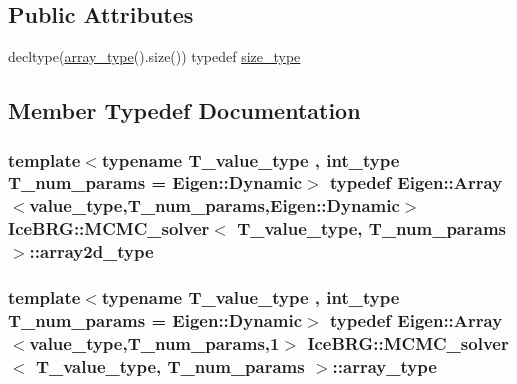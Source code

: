 \subsection*{Public Attributes}
\begin{DoxyCompactItemize}
\item 
decltype(\hyperlink{classIceBRG_1_1MCMC__solver_ad97acf248381de04fa6fc4bdcd3f9a63}{array\+\_\+type}().size()) typedef \hyperlink{classIceBRG_1_1MCMC__solver_ae03c5e41621464a1bfcc7aac7cace475}{size\+\_\+type}
\end{DoxyCompactItemize}


\subsection{Member Typedef Documentation}
\hypertarget{classIceBRG_1_1MCMC__solver_a078c222e71acc977dd50aa67f50a9983}{}
\subsubsection[{array2d\+\_\+type}]{\setlength{\rightskip}{0pt plus 5cm}template$<$typename T\+\_\+value\+\_\+type , int\+\_\+type T\+\_\+num\+\_\+params = Eigen\+::\+Dynamic$>$ typedef Eigen\+::\+Array$<${\bf value\+\_\+type},T\+\_\+num\+\_\+params,Eigen\+::\+Dynamic$>$ {\bf Ice\+B\+R\+G\+::\+M\+C\+M\+C\+\_\+solver}$<$ T\+\_\+value\+\_\+type, T\+\_\+num\+\_\+params $>$\+::{\bf array2d\+\_\+type}}\label{classIceBRG_1_1MCMC__solver_a078c222e71acc977dd50aa67f50a9983}
\hypertarget{classIceBRG_1_1MCMC__solver_ad97acf248381de04fa6fc4bdcd3f9a63}{}
\subsubsection[{array\+\_\+type}]{\setlength{\rightskip}{0pt plus 5cm}template$<$typename T\+\_\+value\+\_\+type , int\+\_\+type T\+\_\+num\+\_\+params = Eigen\+::\+Dynamic$>$ typedef Eigen\+::\+Array$<${\bf value\+\_\+type},T\+\_\+num\+\_\+params,1$>$ {\bf Ice\+B\+R\+G\+::\+M\+C\+M\+C\+\_\+solver}$<$ T\+\_\+value\+\_\+type, T\+\_\+num\+\_\+params $>$\+::{\bf array\+\_\+type}}\label{classIceBRG_1_1MCMC__solver_ad97acf248381de04fa6fc4bdcd3f9a63}
\hypertarget{classIceBRG_1_1MCMC__solver_a900afb5655f8fd450d507b642c4a5a8b}{}

